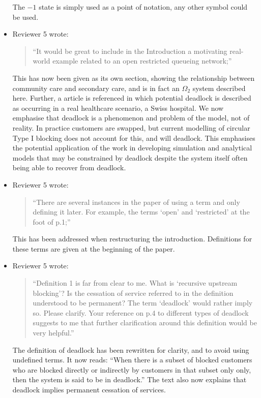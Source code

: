\documentclass{article}
\begin{document}
\begin{itemize}
The $-1$ state is simply used as a point of notation, any other symbol could be
used.

\item Reviewer 5 wrote:
\begin{quote}
``It would be great to include in the Introduction a motivating real-world
example related to an open restricted queueing network;''
\end{quote}
This has now been given as its own section, showing the relationship between
community care and secondary care, and is in fact an $\Omega_2$ system
described here.
Further, a article is referenced in which potential deadlock is described as
occurring in a real healthcare scenario, a Swiss hospital.
We now emphasise that deadlock is a phenomenon and problem of the model, not
of reality.
In practice customers are swapped, but current modelling of circular Type I
blocking does not account for this, and will deadlock.
This emphasises the potential application of the work in developing simulation
and analytical models that may be constrained by deadlock despite the system
itself often being able to recover from deadlock.


\item Reviewer 5 wrote:
\begin{quote}
``There are several instances in the paper of using a term and only defining
it later.
For example, the terms ‘open’ and ‘restricted’ at the foot of p.1;''
\end{quote}
This has been addressed when restructuring the introduction.
Definitions for these terms are given at the beginning of the paper.

\item Reviewer 5 wrote:
\begin{quote}
``Definition 1 is far from clear to me.
What is ‘recursive upstream blocking’?
Is the cessation of service referred to in the definition understood to be
permanent?
The term ‘deadlock’ would rather imply so.
Please clarify.
Your reference on p.4 to different types of deadlock suggests to me that
further clarification around this definition would be very helpful.''
\end{quote}
The definition of deadlock has been rewritten for clarity, and to avoid using
undefined terms.
It now reads:
``When there is a subset of blocked customers who are blocked directly or
indirectly by customers in that subset only only, then the system is said to
be in deadlock.''
The text also now explains that deadlock implies permanent cessation of
services.


\end{itemize}
\end{document}
